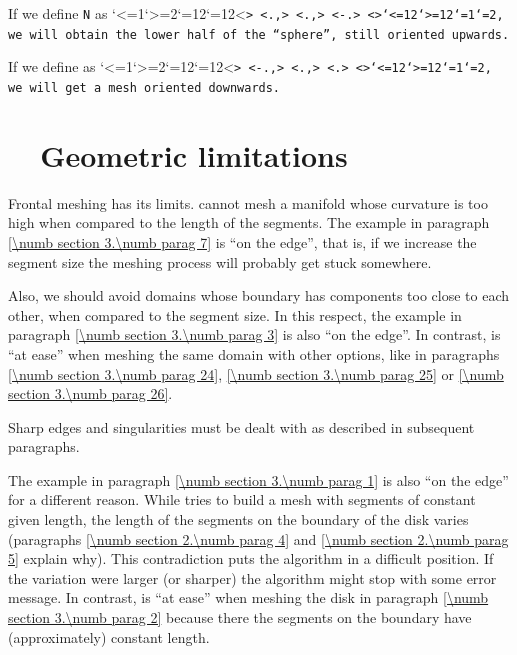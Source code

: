 If we define {\small\tt\azul N} as \catcode`<=1\catcode`>=2\catcode`{=12\catcode`}=12<\small\tt {>
<\small\tt{}\laranja.,> <\small\tt{}\laranja.,>
<\small\tt \laranja-\laranja.> <\small\tt }>\catcode`<=12\catcode`>=12\catcode`{=1\catcode`}=2, we will obtain
the lower half of the ``sphere'', still oriented upwards.

If we define {\small\tt{}} as \catcode`<=1\catcode`>=2\catcode`{=12\catcode`}=12<\small\tt {>
<\small\tt\laranja-\laranja.,> <\small\tt{}\laranja.,> <\small\tt{}\laranja.> <\small\tt }>\catcode`<=12\catcode`>=12\catcode`{=1\catcode`}=2, we will get a mesh
oriented downwards.


\section{~~Geometric limitations}\label{\numb section 3.\numb parag 16}

Frontal meshing has its limits.
{\ManiFEM} cannot mesh a manifold whose curvature is too high when compared to the
length of the segments.
The example in paragraph \ref{\numb section 3.\numb parag 7} is ``on the edge'', that is,
if we increase the segment size the meshing process will probably get stuck somewhere.

Also, we should avoid domains whose boundary has components too close to each other,
when compared to the segment size.
In this respect, the example in paragraph \ref{\numb section 3.\numb parag 3} is also
``on the edge''.
In contrast, {\maniFEM} is ``at ease'' when meshing the same domain with other options,
like in paragraphs \ref{\numb section 3.\numb parag 24}, \ref{\numb section 3.\numb parag 25}
or \ref{\numb section 3.\numb parag 26}.

Sharp edges and singularities must be dealt with as described in subsequent paragraphs.

The example in paragraph \ref{\numb section 3.\numb parag 1} is also ``on the edge''
for a different reason.
While {\maniFEM} tries to build a mesh with segments of constant given length,
the length of the segments on the boundary of the disk varies (paragraphs
\ref{\numb section 2.\numb parag 4} and \ref{\numb section 2.\numb parag 5} explain why).
This contradiction puts the algorithm in a difficult position.
If the variation were larger (or sharper) the algorithm might stop with some error message.
In contrast, {\maniFEM} is ``at ease'' when meshing the disk in paragraph
\ref{\numb section 3.\numb parag 2} because there the segments on the boundary have
(approximately) constant length.

